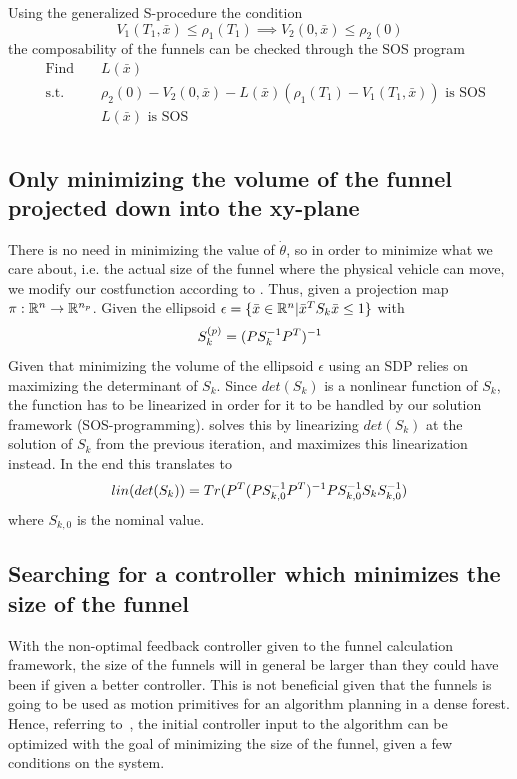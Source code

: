 Using the generalized S-procedure the condition
\begin{equation}
  V_1(T_1,\bar{x}) \leq \rho_1(T_1) \implies V_2(0, \bar{x}) \leq \rho_2(0)
\end{equation}
the composability of the funnels can be checked through the \ac{SOS} program
\begin{align*}
    & \text{Find } && L(\bar{x}) \\
    & \text{s.t. } && \rho_2(0) - V_2(0,\bar{x}) - L(\bar{x})\left( \rho_1(T_1) - V_1(T_1,\bar{x}) \right) \text{ is SOS} \\
    &&& L(\bar{x}) \text{ is SOS} \\
\end{align*}

\subsection{Only minimizing the volume of the funnel projected down into the
  xy-plane}

There is no need in minimizing the value of \(\dot{\theta}\), so in order to
minimize what we care about, i.e. the actual size of the funnel where the
physical vehicle can move, we modify our costfunction according to
\cite{majumdarFunnelLibrariesRealtime2017}. Thus, given a projection map \(\pi :
\mathbb{R}^n \rightarrow \mathbb{R}^{n_p}\). Given the ellipsoid \(\epsilon = \lbrace\bar{x} \in
  \mathbb{R}^n | \bar{x}^TS_{k}\bar{x} \leq 1\rbrace\) with
\[
  S_k^{(p)} = \lparen PS_k^{-1}P^T\rparen^{-1}
\]
Given that minimizing the volume of the ellipsoid \(\epsilon\) using an SDP
relies on maximizing the determinant of \(S_k\). Since \(det(S_k)\) is a
nonlinear function of \(S_k\), the function has to be linearized in order for it
to be handled by our solution framework (SOS-programming).
\cite{majumdarFunnelLibrariesRealtime2017} solves this by linearizing
\(det(S_k)\) at the solution of \(S_k\) from the previous iteration, and
maximizes this linearization instead. In the end this translates to
\[
  lin\lparen det\lparen S_k\rparen\rparen =
  Tr\lparen P^T\lparen PS_{k,0}^{-1}P^T\rparen^{-1}PS_{k,0}^{-1}S_kS_{k,0}^{-1}\rparen
\]
where \(S_{k,0}\) is the nominal value.

\subsection{Searching for a controller which minimizes the size of the funnel}

With the non-optimal feedback controller given to the funnel calculation
framework, the size of the funnels will in general be larger than they could
have been if given a better controller. This is not beneficial given that the
funnels is going to be used as motion primitives for an algorithm planning in a
dense forest. Hence, referring to~\cite[Majumdar.sec~4.3.2 (Feedback control
synthesis)]{majumdarFunnelLibrariesRealtime2017}, the initial controller input
to the algorithm can be optimized with the goal of minimizing the size of the
funnel, given a few conditions on the system.

